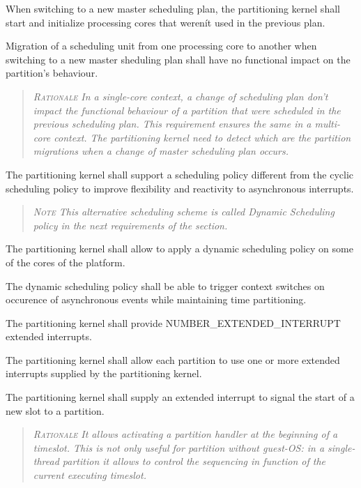 When switching to a new master scheduling plan, the partitioning kernel shall start and initialize processing cores that werenít used in the previous plan.

Migration of a scheduling unit from one processing core to another when switching to a new master sheduling plan shall have no functional impact on the partition's behaviour.
\begin{quote}\it
\textsc{Rationale}
In a single-core context, a change of scheduling plan don't impact the functional behaviour of a partition that were scheduled in the previous scheduling plan. This requirement ensures the same in a multi-core context. The partitioning kernel need to detect which are the partition migrations when a change of master scheduling plan occurs.
\end{quote}

The partitioning kernel shall support a scheduling policy different from the cyclic scheduling policy to improve flexibility and reactivity to asynchronous interrupts.
\begin{quote}\it
\textsc{Note}
This alternative scheduling scheme is called Dynamic Scheduling policy in the next requirements of the section.
\end{quote}

The partitioning kernel shall allow to apply a dynamic scheduling policy on some of the cores of the platform.

The dynamic scheduling policy shall be able to trigger context switches on occurence of asynchronous events while maintaining time partitioning.

The partitioning kernel shall provide NUMBER\_EXTENDED\_INTERRUPT extended interrupts.

The partitioning kernel shall allow each partition to use one or more extended interrupts supplied by the partitioning kernel.

The partitioning kernel shall supply an extended interrupt to signal the start of a new slot to a partition.
\begin{quote}\it
\textsc{Rationale}
It allows activating a partition handler at the beginning of a timeslot. This is not only useful for partition without guest-OS: in a single-thread partition it allows to control the sequencing in function of the current executing timeslot.
\end{quote}

